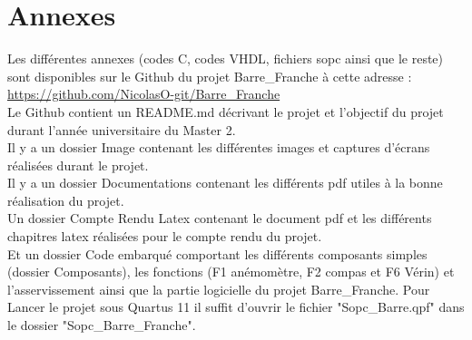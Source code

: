 \section{Annexes}
Les différentes annexes (codes C, codes VHDL, fichiers sopc ainsi que le reste) sont disponibles sur le Github du projet Barre\_Franche à cette adresse :\\

\url{https://github.com/NicolasO-git/Barre\_Franche}\\\newline
Le Github contient un README.md décrivant le projet et l'objectif du projet durant l'année universitaire du Master 2.\\\newline
Il y a un dossier Image contenant les différentes images et captures d'écrans réalisées durant le projet.\\\newline
Il y a un dossier Documentations contenant les différents pdf utiles à la bonne réalisation du projet.\\\newline
Un dossier Compte Rendu Latex contenant le document pdf et les différents chapitres latex réalisées pour le compte rendu du projet.\\\newline 
Et un dossier Code embarqué comportant les différents composants simples (dossier Composants), les fonctions (F1 anémomètre, F2 compas et F6 Vérin) et l'asservissement ainsi que la partie logicielle du projet Barre\_Franche. Pour Lancer le projet sous Quartus 11 il suffit d'ouvrir le fichier "Sopc\_Barre.qpf" dans le dossier "Sopc\_Barre\_Franche".